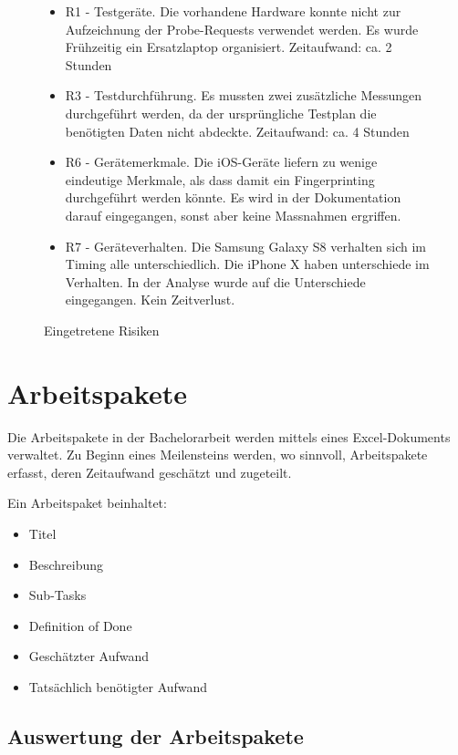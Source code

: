 \begin{figure}[h!]
	\begin{itemize}
	\item R1 - Testgeräte. Die vorhandene Hardware konnte nicht zur 
	Aufzeichnung der Probe-Requests verwendet werden. Es wurde 
	Frühzeitig ein Ersatzlaptop organisiert. Zeitaufwand: ca. 2 Stunden 
	\item R3 - Testdurchführung. Es mussten zwei zusätzliche Messungen 
	durchgeführt werden, da der ursprüngliche Testplan die benötigten 
	Daten nicht abdeckte. Zeitaufwand: ca. 4 Stunden
	\item R6 - Gerätemerkmale. Die iOS-Geräte liefern zu wenige 
	eindeutige Merkmale, als dass damit ein Fingerprinting durchgeführt
	werden könnte. Es wird in der Dokumentation darauf eingegangen, 
	sonst aber keine Massnahmen ergriffen.
	\item R7 - Geräteverhalten. Die Samsung Galaxy S8 verhalten sich im 
	Timing alle unterschiedlich. Die iPhone X haben unterschiede im Verhalten.
	In der Analyse wurde auf die Unterschiede eingegangen. Kein Zeitverlust.
	\end{itemize}
	\caption{Eingetretene Risiken
	\label{figure:EingetreteneRisiken}}
\end{figure}

\clearpage

\section{Arbeitspakete}
Die Arbeitspakete in der Bachelorarbeit werden mittels eines Excel-Dokuments 
verwaltet. Zu Beginn eines Meilensteins werden, wo sinnvoll, Arbeitspakete
erfasst, deren Zeitaufwand geschätzt und zugeteilt. 

Ein Arbeitspaket beinhaltet:
\begin{itemize}
	\item Titel
	\item Beschreibung
	\item Sub-Tasks
	\item Definition of Done 
	\item Geschätzter Aufwand
	\item Tatsächlich benötigter Aufwand
\end{itemize}

\subsection*{Auswertung der Arbeitspakete}


